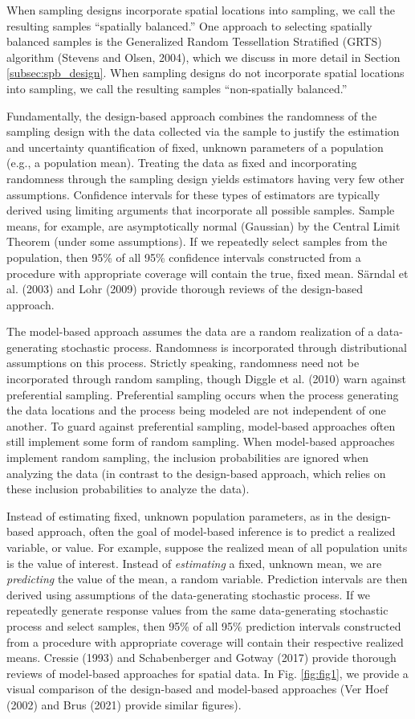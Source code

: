\documentclass[]{elsarticle} %
\begin{document}
When sampling designs incorporate spatial locations into sampling, we
call the resulting samples ``spatially balanced.'' One approach to
selecting spatially balanced samples is the Generalized Random
Tessellation Stratified (GRTS) algorithm (Stevens and Olsen, 2004),
which we discuss in more detail in Section \ref{subsec:spb_design}. When
sampling designs do not incorporate spatial locations into sampling, we
call the resulting samples ``non-spatially balanced.''

Fundamentally, the design-based approach combines the randomness of the
sampling design with the data collected via the sample to justify the
estimation and uncertainty quantification of fixed, unknown parameters
of a population (e.g., a population mean). Treating the data as fixed
and incorporating randomness through the sampling design yields
estimators having very few other assumptions. Confidence intervals for
these types of estimators are typically derived using limiting arguments
that incorporate all possible samples. Sample means, for example, are
asymptotically normal (Gaussian) by the Central Limit Theorem (under
some assumptions). If we repeatedly select samples from the population,
then 95\% of all 95\% confidence intervals constructed from a procedure
with appropriate coverage will contain the true, fixed mean. Särndal et
al. (2003) and Lohr (2009) provide thorough reviews of the design-based
approach.

The model-based approach assumes the data are a random realization of a
data-generating stochastic process. Randomness is incorporated through
distributional assumptions on this process. Strictly speaking,
randomness need not be incorporated through random sampling, though
Diggle et al. (2010) warn against preferential sampling. Preferential
sampling occurs when the process generating the data locations and the
process being modeled are not independent of one another. To guard
against preferential sampling, model-based approaches often still
implement some form of random sampling. When model-based approaches
implement random sampling, the inclusion probabilities are ignored when
analyzing the data (in contrast to the design-based approach, which
relies on these inclusion probabilities to analyze the data).

Instead of estimating fixed, unknown population parameters, as in the
design-based approach, often the goal of model-based inference is to
predict a realized variable, or value. For example, suppose the realized
mean of all population units is the value of interest. Instead of
\emph{estimating} a fixed, unknown mean, we are \emph{predicting} the
value of the mean, a random variable. Prediction intervals are then
derived using assumptions of the data-generating stochastic process. If
we repeatedly generate response values from the same data-generating
stochastic process and select samples, then 95\% of all 95\% prediction
intervals constructed from a procedure with appropriate coverage will
contain their respective realized means. Cressie (1993) and
Schabenberger and Gotway (2017) provide thorough reviews of model-based
approaches for spatial data. In Fig. \ref{fig:fig1}, we provide a visual
comparison of the design-based and model-based approaches (Ver Hoef
(2002) and Brus (2021) provide similar figures).
\end{document}
